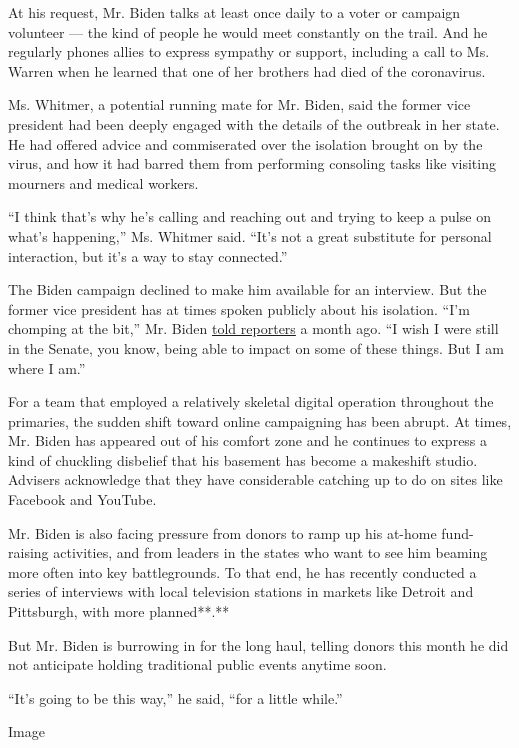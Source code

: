 At his request, Mr. Biden talks at least once daily to a voter or
campaign volunteer --- the kind of people he would meet constantly on
the trail. And he regularly phones allies to express sympathy or
support, including a call to Ms. Warren when he learned that one of her
brothers had died of the coronavirus.

Ms. Whitmer, a potential running mate for Mr. Biden, said the former
vice president had been deeply engaged with the details of the outbreak
in her state. He had offered advice and commiserated over the isolation
brought on by the virus, and how it had barred them from performing
consoling tasks like visiting mourners and medical workers.

``I think that's why he's calling and reaching out and trying to keep a
pulse on what's happening,'' Ms. Whitmer said. ``It's not a great
substitute for personal interaction, but it's a way to stay connected.''

The Biden campaign declined to make him available for an interview. But
the former vice president has at times spoken publicly about his
isolation. ``I'm chomping at the bit,'' Mr. Biden
\href{https://www.nytimes.com/2020/03/25/us/politics/bernie-sanders-joe-biden-next-debate.html}{told
reporters} a month ago. ``I wish I were still in the Senate, you know,
being able to impact on some of these things. But I am where I am.''

For a team that employed a relatively skeletal digital operation
throughout the primaries, the sudden shift toward online campaigning has
been abrupt. At times, Mr. Biden has appeared out of his comfort zone
and he continues to express a kind of chuckling disbelief that his
basement has become a makeshift studio. Advisers acknowledge that they
have considerable catching up to do on sites like Facebook and YouTube.

Mr. Biden is also facing pressure from donors to ramp up his at-home
fund-raising activities, and from leaders in the states who want to see
him beaming more often into key battlegrounds. To that end, he has
recently conducted a series of interviews with local television stations
in markets like Detroit and Pittsburgh, with more planned**.**

But Mr. Biden is burrowing in for the long haul, telling donors this
month he did not anticipate holding traditional public events anytime
soon.

``It's going to be this way,'' he said, ``for a little while.''

Image

